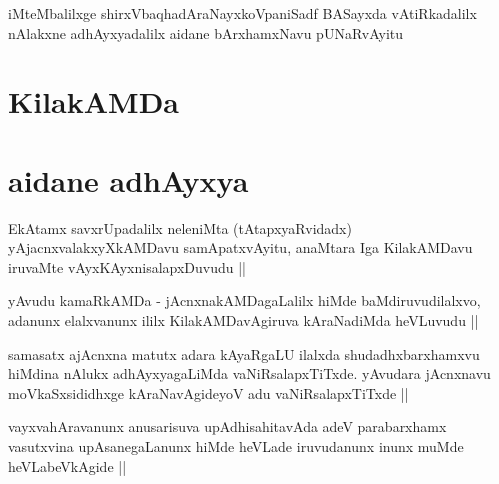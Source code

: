 \begin{center}
iMteMbalilxge shirxVbaqhadAraNayxkoVpaniSadf BASayxda vAtiRkadalilx nAlakxne adhAyxyadalilx aidane bArxhamxNavu pUNaRvAyitu
\end{center}




\section*{KilakAMDa}

\section*{aidane adhAyxya}


\begin{artha}
EkAtamx savxrUpadalilx neleniMta (tAtapxyaRvidadx) yAjacnxvalakxyXkAMDavu samApatxvAyitu, anaMtara Iga KilakAMDavu iruvaMte vAyxKAyxnisalapxDuvudu ||
\end{artha}


\begin{artha}
yAvudu kamaRkAMDa - jAcnxnakAMDagaLalilx hiMde baMdiruvudilalxvo, adanunx elalxvanunx ililx KilakAMDavAgiruva kAraNadiMda heVLuvudu ||
\end{artha}


\begin{artha}
samasatx ajAcnxna matutx adara kAyaRgaLU ilalxda shudadhxbarxhamxvu hiMdina nAlukx adhAyxyagaLiMda vaNiRsalapxTiTxde. yAvudara jAcnxnavu moVkaSxsididhxge kAraNavAgideyoV adu vaNiRsalapxTiTxde ||
\end{artha}

\begin{artha}
vayxvahAravanunx anusarisuva upAdhisahitavAda adeV parabarxhamx vasutxvina upAsanegaLanunx hiMde heVLade iruvudanunx inunx muMde heVLabeVkAgide ||
\end{artha}


